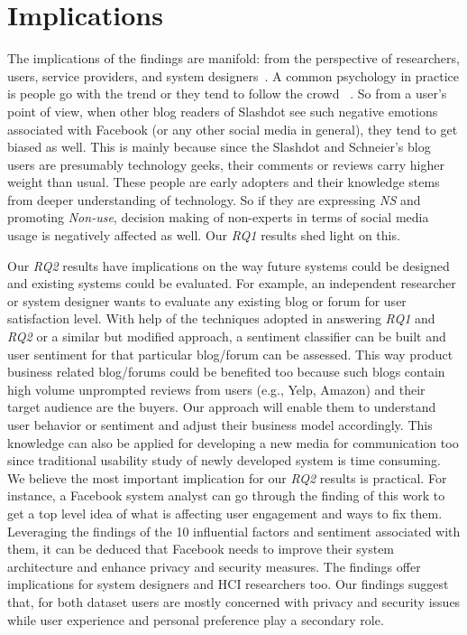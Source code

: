 \section{Implications}
\label{sec:implications}
The implications of the findings are manifold: from the perspective of researchers, users, service providers, and system designers~\cite{baumer2015importance}. A common psychology in practice is people go with the trend or they tend to follow the crowd ~\cite{gilbert2009blogs}. So from a user's point of view, when other blog readers of Slashdot see such negative emotions associated with Facebook (or any other social media in general), they tend to get biased as well. This is mainly because since the Slashdot and Schneier's blog users are presumably technology geeks, their comments or reviews carry higher weight than usual. These people are early adopters and their knowledge stems from deeper understanding of technology. So if they are expressing \emph{NS} and promoting \textit{Non-use}, decision making of non-experts in terms of social media usage is negatively affected as well. Our \textit{RQ1} results shed light on this. 


Our \textit{RQ2} results have implications on the way future systems could be designed and existing systems could be evaluated. For example, an independent researcher or system designer wants to evaluate any existing blog or forum for user satisfaction level. With help of the techniques adopted in answering \textit{RQ1} and \textit{RQ2} or a similar but modified approach, a sentiment classifier can be built and user sentiment for that particular blog/forum can be assessed. This way product business related blog/forums could be benefited too because such blogs contain high volume unprompted reviews from users (e.g., Yelp, Amazon) and their target audience are the buyers. Our approach will enable them to understand user behavior or sentiment and adjust their business model accordingly. This knowledge can also be applied for developing a new media for communication too since traditional usability study of newly developed system is time consuming. We believe the most important implication for our \textit{RQ2} results is practical. For instance, a Facebook system analyst can go through the finding of this work to get a top level idea of what is affecting user engagement and ways to fix them. Leveraging the findings of the 10 influential factors and sentiment associated with them, it can be deduced that Facebook needs to improve their system architecture and enhance privacy and security measures. The findings offer implications for system designers and HCI researchers too. Our findings suggest that, for both dataset users are mostly concerned with privacy and security issues while user experience and personal preference play a secondary role. 

